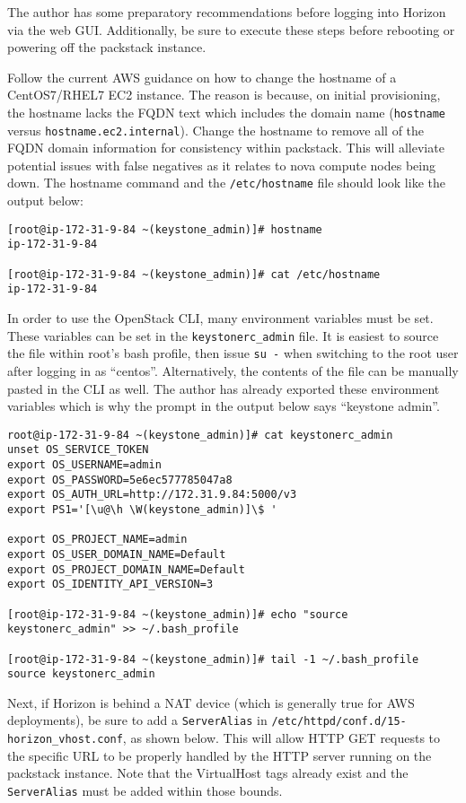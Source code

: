 The author has some preparatory recommendations before logging into Horizon
via the web GUI\@. Additionally, be sure to execute these steps before rebooting
or powering off the packstack instance.

Follow the current AWS guidance on how to change the hostname of a
CentOS7/RHEL7 EC2 instance. The reason is because, on initial provisioning,
the hostname lacks the FQDN text which includes the domain name (\verb|hostname|
versus \verb|hostname.ec2.internal|). Change the hostname to remove all of the
FQDN domain information for consistency within packstack. This will alleviate
potential issues with false negatives as it relates to nova compute nodes
being down. The hostname command and the \verb|/etc/hostname| file should look
like the output below:

\begin{verbatim}
[root@ip-172-31-9-84 ~(keystone_admin)]# hostname
ip-172-31-9-84

[root@ip-172-31-9-84 ~(keystone_admin)]# cat /etc/hostname
ip-172-31-9-84
\end{verbatim}

In order to use the OpenStack CLI, many environment variables must be set.
These variables can be set in the \verb|keystonerc_admin| file. It is easiest
to source the file within root’s bash profile, then issue \verb|su -| when
switching to the root user after logging in as ``centos''. Alternatively, the
contents of the file can be manually pasted in the CLI as well. The author has
already exported these environment variables which is why the prompt in the
output below says ``keystone admin''.

\begin{verbatim}
root@ip-172-31-9-84 ~(keystone_admin)]# cat keystonerc_admin
unset OS_SERVICE_TOKEN
export OS_USERNAME=admin
export OS_PASSWORD=5e6ec577785047a8
export OS_AUTH_URL=http://172.31.9.84:5000/v3
export PS1='[\u@\h \W(keystone_admin)]\$ '

export OS_PROJECT_NAME=admin
export OS_USER_DOMAIN_NAME=Default
export OS_PROJECT_DOMAIN_NAME=Default
export OS_IDENTITY_API_VERSION=3

[root@ip-172-31-9-84 ~(keystone_admin)]# echo "source keystonerc_admin" >> ~/.bash_profile

[root@ip-172-31-9-84 ~(keystone_admin)]# tail -1 ~/.bash_profile
source keystonerc_admin
\end{verbatim}

Next, if Horizon is behind a NAT device (which is generally true for AWS
deployments), be sure to add a \verb|ServerAlias| in
\verb|/etc/httpd/conf.d/15-horizon_vhost.conf|, as shown below. This will
allow HTTP GET requests to the specific URL to be properly handled by the HTTP
server running on the packstack instance. Note that the VirtualHost tags
already exist and the \verb|ServerAlias| must be added within those bounds.

